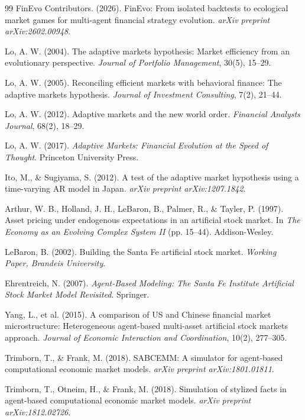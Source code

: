 \begin{thebibliography}{99}
FinEvo Contributors. (2026). FinEvo: From isolated backtests to ecological market games for multi-agent financial strategy evolution. \textit{arXiv preprint arXiv:2602.00948}.

Lo, A. W. (2004). The adaptive markets hypothesis: Market efficiency from an evolutionary perspective. \textit{Journal of Portfolio Management}, 30(5), 15--29.

Lo, A. W. (2005). Reconciling efficient markets with behavioral finance: The adaptive markets hypothesis. \textit{Journal of Investment Consulting}, 7(2), 21--44.

Lo, A. W. (2012). Adaptive markets and the new world order. \textit{Financial Analysts Journal}, 68(2), 18--29.

Lo, A. W. (2017). \textit{Adaptive Markets: Financial Evolution at the Speed of Thought}. Princeton University Press.

Ito, M., \& Sugiyama, S. (2012). A test of the adaptive market hypothesis using a time-varying AR model in Japan. \textit{arXiv preprint arXiv:1207.1842}.

Arthur, W. B., Holland, J. H., LeBaron, B., Palmer, R., \& Tayler, P. (1997). Asset pricing under endogenous expectations in an artificial stock market. In \textit{The Economy as an Evolving Complex System II} (pp. 15--44). Addison-Wesley.

LeBaron, B. (2002). Building the Santa Fe artificial stock market. \textit{Working Paper, Brandeis University}.

Ehrentreich, N. (2007). \textit{Agent-Based Modeling: The Santa Fe Institute Artificial Stock Market Model Revisited}. Springer.

Yang, L., et al. (2015). A comparison of US and Chinese financial market microstructure: Heterogeneous agent-based multi-asset artificial stock markets approach. \textit{Journal of Economic Interaction and Coordination}, 10(2), 277--305.

Trimborn, T., \& Frank, M. (2018). SABCEMM: A simulator for agent-based computational economic market models. \textit{arXiv preprint arXiv:1801.01811}.

Trimborn, T., Otneim, H., \& Frank, M. (2018). Simulation of stylized facts in agent-based computational economic market models. \textit{arXiv preprint arXiv:1812.02726}.


\end{thebibliography}
